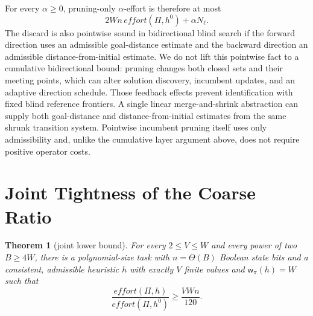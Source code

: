 \documentclass[letterpaper]{article}
\newcommand{\task}{\ensuremath{\Pi}}
\newcommand{\hblind}{\ensuremath{h^{0}}}
\newcommand{\width}{\ensuremath{\mathsf{w}}}
\newcommand{\values}{\ensuremath{V}}
\newcommand{\effort}{\ensuremath{\mathit{effort}}}
\theoremstyle{plain}
\newtheorem{theorem}{Theorem}
\theoremstyle{definition}
\theoremstyle{remark}
\begin{document}
For every $\alpha\geq0$, pruning-only $\alpha$-effort is therefore at
most
\[
 2Wn\,\effort(\task,\hblind)+\alpha N_\ell.
\]
The discard is also pointwise sound in bidirectional blind search if the
forward direction uses an admissible goal-distance estimate and the
backward direction an admissible distance-from-initial estimate. We do not
lift this pointwise fact to a cumulative bidirectional bound: pruning
changes both closed sets and their meeting points, which can alter solution
discovery, incumbent updates, and an adaptive direction schedule. Those
feedback effects prevent identification with fixed blind reference
frontiers. A single linear merge-and-shrink abstraction can supply both
goal-distance and distance-from-initial estimates from the same shrunk
transition system. Pointwise incumbent pruning itself uses only
admissibility and, unlike the cumulative layer argument above, does not
require positive operator costs.

\section{Joint Tightness of the Coarse Ratio}

\begin{theorem}[joint lower bound]
\label{thm-tight}
For every $2\leq\values\leq W$ and every power of two $B\geq4W$, there
is a polynomial-size task with $n=\Theta(B)$ Boolean state bits and a
consistent, admissible heuristic $h$ with exactly $\values$ finite values and
$\width_\pi(h)=W$ such that
\[
  \frac{\effort(\task,h)}{\effort(\task,\hblind)}
  \geq \frac{\values Wn}{120}.
\]
\end{theorem}
\end{document}
